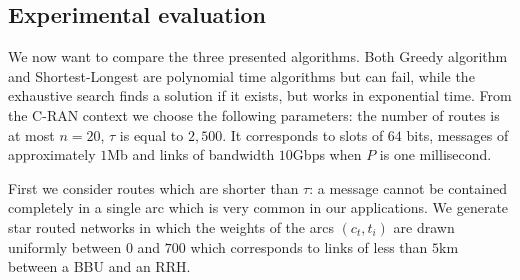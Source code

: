 \documentclass[10pt, conference, letterpaper]{IEEEtran}
\newcommand\pazl{\textsc{pazl}\xspace}
\begin{document}
   
   
   \subsection{Experimental evaluation}\label{sec:exp_PAZL}
   
   We now want to compare the three presented algorithms. Both Greedy algorithm and Shortest-Longest are polynomial time algorithms but can fail, while the exhaustive search finds a solution if it exists, but works in exponential time. 
   From the C-RAN context we choose the following parameters: the number of routes is at most $n = 20$, $\tau$ is equal to $2,500$.
      It corresponds to slots of $64$ bits, messages of approximately $1$Mb and links of bandwidth $10$Gbps when $P$ is one millisecond.
      
%      

%      


      
      First we consider routes which are shorter than $\tau$: a message cannot be contained completely in a single arc which is very common in our applications. We generate star routed networks in which the weights of the arcs $(c_t,t_i)$ are drawn uniformly between $0$ and $700$ which corresponds to links of less than $5$km between a BBU and an RRH. 
      
      
\end{document}
